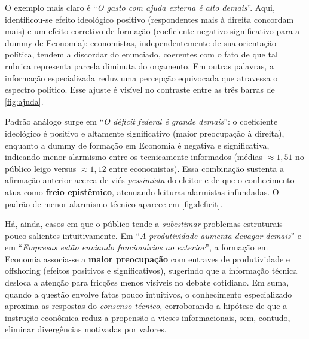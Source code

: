 O exemplo mais claro é ``\textit{O gasto com ajuda externa é alto demais}''. Aqui, identificou-se efeito ideológico positivo (respondentes mais à direita concordam mais) e um efeito corretivo de formação (coeficiente negativo significativo para a dummy de Economia): economistas, independentemente de sua orientação política, tendem a discordar do enunciado, coerentes com o fato de que tal rubrica representa parcela diminuta do orçamento. Em outras palavras, a informação especializada reduz uma percepção equivocada que atravessa o espectro político. Esse ajuste é visível no contraste entre as três barras de \autoref{fig:ajuda}.

Padrão análogo surge em ``\textit{O déficit federal é grande demais}'': o coeficiente ideológico é positivo e altamente significativo (maior preocupação à direita), enquanto a dummy de formação em Economia é negativa e significativa, indicando menor alarmismo entre os tecnicamente informados (médias $\approx1{,}51$ no público leigo versus $\approx1{,}12$ entre economistas). Essa combinação sustenta a afirmação anterior acerca de viés \textit{pessimista} do eleitor e de que o conhecimento atua como \textbf{freio epistêmico}, atenuando leituras alarmistas infundadas. O padrão de menor alarmismo técnico aparece em \autoref{fig:deficit}.

Há, ainda, casos em que o público tende a \textit{subestimar} problemas estruturais pouco salientes intuitivamente. Em ``\textit{A produtividade aumenta devagar demais}'' e em ``\textit{Empresas estão enviando funcionários ao exterior}'', a formação em Economia associa-se a \textbf{maior preocupação} com entraves de produtividade e offshoring (efeitos positivos e significativos), sugerindo que a informação técnica desloca a atenção para fricções menos visíveis no debate cotidiano. Em suma, quando a questão envolve fatos pouco intuitivos, o conhecimento especializado aproxima as respostas do \textit{consenso técnico}, corroborando a hipótese de que a instrução econômica reduz a propensão a vieses informacionais, sem, contudo, eliminar divergências motivadas por valores.

